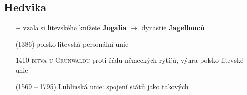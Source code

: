 \documentclass{article}
\begin{document}
\subsection*{Hedvika}
\begin{itemize}
    \vspace{-0.5em}
    \setlength\itemsep{0.15em}
    \item[$-$] vzala si litevského knížete \textbf{Jogalia} $\rightarrow$ dynastie \textbf{Jagellonců}
    \item[(1386)] polsko-litevská personální unie
\end{itemize}

\begin{itemize}
    \vspace{-0.5em}
    \setlength\itemsep{0.15em}
    \item[1410] \textsc{bitva u Grunwaldu} proti řádu německých rytířů, výhra polsko-litevské unie
    \item[(1569 -- 1795)] Lublinská unie: spojení států jako takových
\end{itemize}
\end{document}
